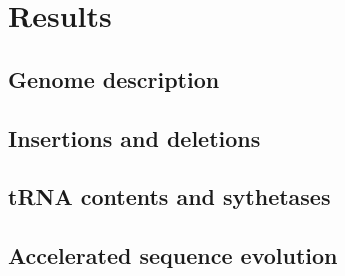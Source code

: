 \documentclass[../main.tex]{subfiles}
\begin{document}
\section{Results}

\subsection{Genome description}
\subsection{Insertions and deletions}
\subsection{tRNA contents and sythetases}
\subsection{Accelerated sequence evolution}
\end{document}
